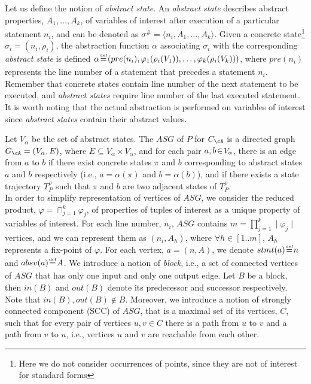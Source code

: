 \documentclass[prodmode,acmtocl]{acmsmall}
\def\uco{\ensuremath{\rho}\xspace}
\def\defi{\mbox{\raisebox{0ex}[1ex][1ex]{$\stackrel{\mbox{\tiny
def}}{\; =\;}$}}}
\newcommand{\0}{\mbox{\bf 0}}
\begin{document}
{{  Let us define the notion of \emph{abstract state}. An \emph{abstract
    state} describes abstract properties, \small$A_1, \ldots,
  A_k$\normalsize, of variables of interest after execution of a
  particular statement $n_i$, and can be denoted as
  \small$\sigma^{\#}\!=\!\langle n_i, A_1, \ldots,
  A_k\rangle$\normalsize. Given a concrete state\footnote{Here we do
    not consider occurrences of points, since they are not of interest
    for standard forms} $\sigma_i\!=\!(n_i, \uco_i)$, the abstraction
  function $\alpha$ associating $\sigma_i$ with the corresponding
  \emph{abstract state} is defined \small$\alpha\!\defi\!(pre(n_i),
  \varphi_1(\uco_i(V_1)), \ldots, \varphi_k(\uco_i(V_k)))$\normalsize,
  where $pre(n_i)$ represents the line number of a statement that
  precedes a statement $n_i$. Remember that concrete states contain
  line number of the next statement to be executed, and \emph{abstract
    states} require line number of the last executed statement. It is
  worth noting that the actual abstraction is performed on variables
  of interest since \emph{abstract states} contain their abstract
  values. 

  Let \small$V_\alpha$ \normalsize be the set of abstract states. The
  $ASG$ of $P$ for \small$C_\cA$ \normalsize is a directed graph
  \small$G_\cA = (V_\alpha, E)$\normalsize, where
  \small$E\!\subseteq\!V_\alpha\!\times\!V_\alpha$\normalsize, and for
  each pair $a, b\!\in\!\mbox{\small$V_\alpha$\normalsize}$, there is
  an edge from $a$ to $b$ if there exist concrete states $\pi$ and $b$
  corresponding to abstract states $a$ and $b$ respectively (i.e.,
  $a\!=\!\alpha(\pi)$ and $b\!=\!\alpha(b)$), and if there exists a
  state trajectory $T_P^\uco$ such that $\pi$ and $b$ are two adjacent
  states of $T_P^\uco$.\\

  In order to simplify representation of vertices of $ASG$, we
  consider the reduced product, $\varphi\!=\!\sqcap_{j=1}^k\varphi_j$,
  of properties of tuples of interest as a unique property of
  variables of interest. For each line number, $n_i$, $ASG$ contains
  $m\!=\!\prod_{j=1}^{k}\!\!\mid\!\!\varphi_j\!\!\mid$ vertices, and
  we can represent them as $(n_i, A_h)$, where $\forall
  h\!\in\![1..m]$, $A_h$ represents a fix-point of $\varphi$. For each
  vertex, $a\!=\!(n, A)$, we denote $stmt(a)\!\defi\!n$ and
  $absv(a)\!\defi\!A$. We introduce a notion of \emph{block}, i.e., a
  set of connected vertices of $ASG$ that has only one input and only
  one output edge. Let $B$ be a block, then $in(B)$ and $out(B)$
  denote its predecessor and successor respectively. Note that $in(B),
  out(B)\!\notin\!B$. Moreover, we introduce a notion of strongly
  connected component (SCC) of $ASG$, that is a maximal set of its
  vertices, $C$, such that for every pair of vertices $u, v\!\in\!C$
  there is a path from $u$ to $v$ and a path from $v$ to $u$, i.e.,
  vertices $u$ and $v$ are reachable from each other.}

}
\end{document}
